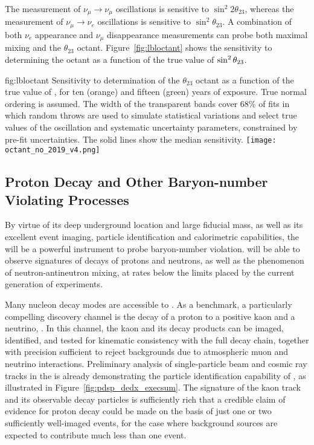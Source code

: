 The measurement of $\nu_\mu \rightarrow \nu_\mu$ oscillations is sensitive to $\sin ^2 2 \theta_{23}$, whereas the measurement of $\nu_\mu \rightarrow \nu_e$ oscillations is sensitive to $\sin^2 \theta_{23}$.  A combination of both $\nu_e$ appearance and $\nu_\mu$ disappearance measurements can probe both maximal mixing and
the $\theta_{23}$ octant.  
Figure~\ref{fig:lbloctant} shows the sensitivity to determining the octant as a function of the true value of $\sin^2\theta_{23}$.

\begin{dunefigure}
{fig:lbloctant}
{Sensitivity to determination of the $\theta_{23}$ octant as a function of the true value of , for ten (orange) and fifteen (green) years of exposure. True normal ordering is assumed. The width of the transparent bands cover 68\% of fits in which random throws are used to simulate statistical variations and select true values of the oscillation and systematic uncertainty parameters, constrained by pre-fit uncertainties. The solid lines show the median sensitivity.}
		\texttt{[image: octant\_no\_2019\_v4.png]}
\end{dunefigure}


\clearpage
\subsection{Proton Decay and Other 
Baryon-number Violating Processes}

By virtue of its deep underground location and large fiducial 
mass, as well as its excellent event imaging, particle 
identification and 
calorimetric capabilities, the   will be 
a powerful instrument %
to probe baryon-number violation.
 will be able to observe signatures of decays of protons and 
neutrons, as well as the phenomenon of neutron-antineutron mixing, 
at rates below the limits placed by the current generation of 
experiments.

Many nucleon decay modes are accessible to .  
As a benchmark, a particularly compelling discovery channel 
is the decay of a proton to a positive kaon and a neutrino, 
\ptoknubar.  In this channel, the kaon and its decay products 
can be imaged, identified, and tested for kinematic consistency 
with the full decay chain, together with precision sufficient to 
reject backgrounds due to atmospheric muon and neutrino 
interactions. 
Preliminary analysis of single-particle beam and cosmic ray tracks 
in the   is already demonstrating the particle 
identification capability of , as illustrated in 
Figure~\ref{fig:pdsp_dedx_execsum}.  
The signature of the kaon track and its observable decay particles is 
sufficiently rich that a credible claim of evidence for 
proton decay could be made on the basis of just 
one or two sufficiently well-imaged events, for the case 
where background sources are expected to contribute much less 
than one event.

